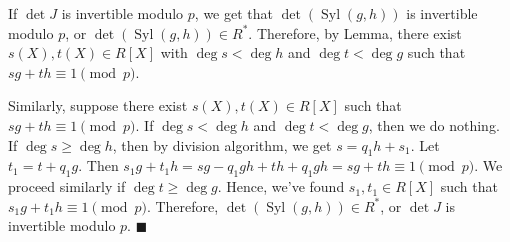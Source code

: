 If $\det{J}$ is invertible modulo $p$, we get that $\det(\operatorname{Syl}(g,h))$ is invertible modulo $p$, or $\det(\operatorname{Syl}(g,h)) \in R^*$. Therefore, by Lemma, there exist $s(X), t(X) \in R[X]$ with $\deg{s}<\deg{h}$ and $\deg{t}<\deg{g}$ such that $sg+th \equiv 1 \pmod{p}$.

Similarly, suppose there exist $s(X),t(X)\in R[X]$ such that $sg+th \equiv 1 \pmod{p}$. If $\deg{s}<\deg{h}$ and $\deg{t}<\deg{g}$, then we do nothing. If $\deg{s}\geq\deg{h}$, then by division algorithm, we get $s = q_1 h + s_1$. Let $t_1 = t+ q_1 g$. Then $s_1 g + t_1 h = sg - q_1 gh + th + q_1 gh = sg + th \equiv 1 \pmod{p}$. We proceed similarly if $\deg{t}\geq\deg{g}$. Hence, we've found $s_1, t_1\in R[X]$ such that $s_1 g + t_1 h \equiv 1 \pmod{p}$. Therefore, $\det(\operatorname{Syl}(g,h))\in R^*$, or $\det{J}$ is invertible modulo $p$. \hfill $\blacksquare$ 